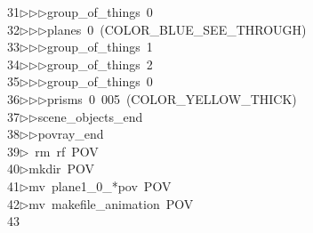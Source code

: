 \begin{tabbing}
31\>$\triangleright$\>$\triangleright$\>$\triangleright$\>group\_of\_things\ 0\ \\[0pt]
32\>$\triangleright$\>$\triangleright$\>$\triangleright$\>planes\ 0\ (COLOR\_BLUE\_SEE\_THROUGH)\ \\[0pt]
33\>$\triangleright$\>$\triangleright$\>$\triangleright$\>group\_of\_things\ 1\ \\[0pt]
34\>$\triangleright$\>$\triangleright$\>$\triangleright$\>group\_of\_things\ 2\ \\[0pt]
35\>$\triangleright$\>$\triangleright$\>$\triangleright$\>group\_of\_things\ 0\ \\[0pt]
36\>$\triangleright$\>$\triangleright$\>$\triangleright$\>prisms\ 0\ 005\ (COLOR\_YELLOW\_THICK)\ \\[0pt]
37\>$\triangleright$\>$\triangleright$\>scene\_objects\_end\ \\[0pt]
38\>$\triangleright$\>$\triangleright$\>povray\_end\\[0pt]
39\>$\triangleright$\>\ rm\ rf\ POV\\[0pt]
40\>$\triangleright$\>mkdir\ POV\\[0pt]
41\>$\triangleright$\>mv\ plane1\_0\_*pov\ POV\\[0pt]
42\>$\triangleright$\>mv\ makefile\_animation\ POV\\[0pt]
43\>\end{tabbing}
